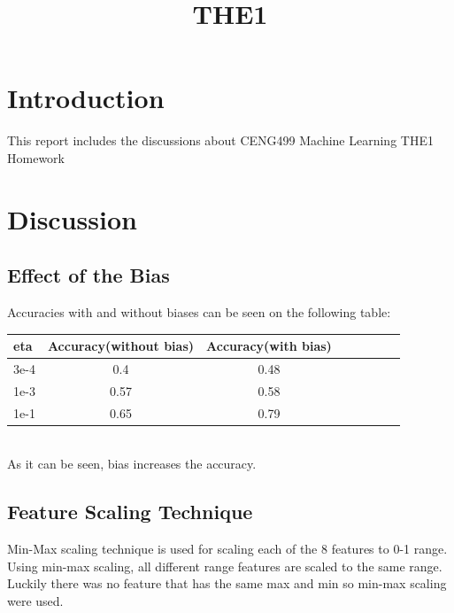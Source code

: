 \documentclass[conference]{IEEEtran}
\begin{document}
\title{THE1\\
}

\author{
}

\maketitle


\section{Introduction}
This report includes the discussions about CENG499 Machine Learning THE1 Homework \\

\section{Discussion}

\subsection{Effect of the Bias}

Accuracies with and without biases can be seen on the following table: \\

\begin{tabular}{l*{6}{c}r}
eta  & Accuracy(without bias) & Accuracy(with bias) \\
\hline
3e-4 & 0.4 & 0.48 \\
1e-3 & 0.57 & 0.58 \\
1e-1 & 0.65 & 0.79 \\
\end{tabular} \\

As it can be seen, bias increases the accuracy.

\subsection{Feature Scaling Technique}

Min-Max scaling technique is used for scaling each of the 8 features to 0-1 range. Using min-max scaling, all different range features are scaled to the same range. Luckily there was no feature that has the same max and min so min-max scaling were used.
\end{document}
